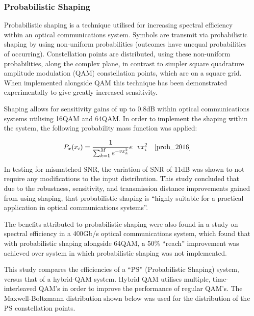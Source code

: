 \subsubsection{Probabilistic Shaping}

Probabilistic shaping is a technique utilised for increasing spectral
efficiency within an optical communications system. Symbols are transmit via
probabilistic shaping by using non-uniform probabilities (outcomes have unequal
probabilities of occurring). Constellation points are distributed, using these
non-uniform probabilities, along the complex plane, in contrast to simpler square
quadrature amplitude modulation (QAM) constellation points, which are on a square
grid. When implemented alongside QAM this technique has been demonstrated
experimentally to give greatly increased sensitivity\cite{prob_2016}\cite{400Gbps_2019}.

\par Shaping allows for sensitivity gains of up to 0.8dB within optical
communications systems utilising 16QAM and 64QAM. In order to implement the
shaping within the system, the following probability mass function was applied:

\begin{equation}
	\label{eq:}
	P_x(x_i) = \frac{1}{\sum_{k=1}^{M} e^{-vx_k^2}}e^-vx_i^2 \quad
	\text{\cite{prob_2016}}
\end{equation}

\par In testing for mismatched SNR, the variation of SNR of 11dB was shown to not
require any modifications to the input distribution\cite{prob_2016}. This study
concluded that due to the robustness, sensitivity, and transmission distance
improvements gained from using shaping, that probabilistic shaping is ``highly
suitable for a practical application in optical communications systems''.

\par The benefits attributed to probabilistic shaping were also found in a study on
spectral efficiency in a 400Gb/s optical communications system, which found that
with probabilistic shaping alongside 64QAM, a 50\% ``reach'' improvement was
achieved over system in which probabilistic shaping was not
implemented\cite{400Gbps_2019}.

\par This study compares the efficiencies of a ``PS'' (Probabilistic Shaping)
system, versus that of a hybrid-QAM system. Hybrid QAM utilises multiple,
time-interleaved QAM's in order to improve the performance of regular QAM's. The
Maxwell-Boltzmann distribution shown below was used for the distribution of the
PS constellation points.

